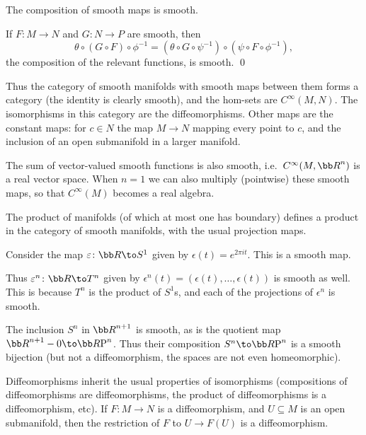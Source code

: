 \ecoro

\bprop

    The composition of smooth maps is smooth.

\eprop

\bproof

    If $F\colon M\to N$ and $G\colon N\to P$ are smooth, then
    $$ \theta\circ(G\circ F)\circ\phi^{-1} = (\theta\circ G\circ\psi^{-1})\circ(\psi\circ F\circ\phi^{-1}) , $$
    the composition of the relevant functions, is smooth.
    \qed

\eproof

Thus the category of smooth manifolds with smooth maps between them forms a category (the identity is clearly smooth), and the hom-sets are $C^\infty(M,N)$.
The isomorphisms in this category are the diffeomorphisms.
Other maps are the constant maps: for $c\in N$ the map $M\to N$ mapping every point to $c$, and the inclusion of an open submanifold in a larger
manifold.

The sum of vector-valued smooth functions is also smooth, i.e.\ $C^\infty(M,\bR^n)$ is a real vector space.
When $n=1$ we can also multiply (pointwise) these smooth maps, so that $C^\infty(M)$ becomes a real algebra.

\bprop

    The product of manifolds (of which at most one has boundary) defines a product in the category of smooth manifolds, with the usual
    projection maps.

\eprop

\bexam

    Consider the map $\epsilon\colon\bR\to S^1$ given by $\epsilon(t)=e^{2\pi it}$.
    This is a smooth map.

    Thus $\epsilon^n\colon\bR\to T^n$ given by $\epsilon^n(t)=(\epsilon(t),\dots,\epsilon(t))$ is smooth as well.
    This is because $T^n$ is the product of $S^1$s, and each of the projections of $\epsilon^n$ is smooth.

\eexam

\bexam

    The inclusion $S^n$ in $\bR^{n+1}$ is smooth, as is the quotient map $\bR^{n+1}-0\to\RP^n$.
    Thus their composition $S^n\to\RP^n$ is a smooth bijection (but not a diffeomorphism, the spaces are not even homeomorphic).

\eexam

Diffeomorphisms inherit the usual properties of isomorphisms (compositions of diffeomorphisms are diffeomorphisms, the product of diffeomorphisms
is a diffeomorphism, etc).
If $F\colon M\to N$ is a diffeomorphism, and $U\subseteq M$ is an open submanifold, then the restriction of $F$ to $U\to F(U)$ is a diffeomorphism.


